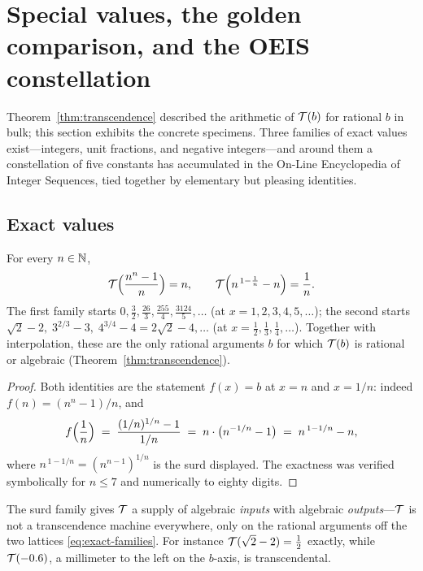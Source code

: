 \section{Special values, the golden comparison, and the OEIS
constellation}\label{sec:values}

Theorem~\ref{thm:transcendence} described the arithmetic of $\mathcal{T}(b)$
for rational $b$ in bulk; this section exhibits the concrete specimens.
Three families of exact values exist---integers, unit fractions, and
negative integers---and around them a constellation of five constants
has accumulated in the On-Line Encyclopedia of Integer Sequences, tied
together by elementary but pleasing identities.

\subsection{Exact values}

\begin{proposition}\label{prop:exactvalues}
For every $n \in \mathbb{N}$,
\begin{equation}\label{eq:exact-families}
    \mathcal{T}\Bigl(\frac{n^{n}-1}{n}\Bigr) = n,
    \qquad
    \mathcal{T}\Bigl(n^{\,1-\frac{1}{n}} - n\Bigr) = \frac{1}{n} .
\end{equation}
The first family starts $0, \tfrac32, \tfrac{26}{3}, \tfrac{255}{4},
\tfrac{3124}{5},\ldots$ (at $x = 1,2,3,4,5,\ldots$); the second starts
$\sqrt2 - 2,\; 3^{2/3} - 3,\; 4^{3/4} - 4 = 2\sqrt2 - 4,\ldots$ (at
$x = \tfrac12, \tfrac13, \tfrac14, \ldots$). Together with
interpolation, these are the only rational arguments $b$ for which
$\mathcal{T}(b)$ is rational or algebraic (Theorem~\ref{thm:transcendence}).
\end{proposition}

\begin{proof}
Both identities are the statement $f(x) = b$ at $x = n$ and
$x = 1/n$: indeed $f(n) = (n^{n}-1)/n$, and
\[
    f\Bigl(\frac1n\Bigr) \;=\; \frac{(1/n)^{1/n} - 1}{1/n}
    \;=\; n \cdot \bigl(n^{-1/n} - 1\bigr)
    \;=\; n^{\,1-1/n} - n ,
\]
where $n^{\,1-1/n} = (n^{n-1})^{1/n}$ is the surd displayed. The
exactness was verified symbolically for $n \le 7$ and numerically to
eighty digits.
\end{proof}

The surd family gives $\mathcal{T}$ a supply of algebraic \emph{inputs} with
algebraic \emph{outputs}---$\mathcal{T}$ is not a transcendence machine
everywhere, only on the rational arguments off the two lattices
\eqref{eq:exact-families}. For instance
$\mathcal{T}(\sqrt2 - 2) = \tfrac12$ exactly, while $\mathcal{T}(-0.6)$, a
millimeter to the left on the $b$-axis, is transcendental.

